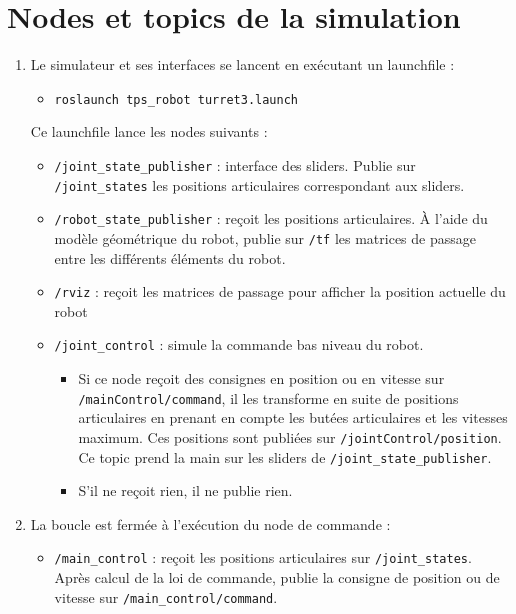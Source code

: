 \documentclass[12pt,a4paper]{article}
\begin{document}
\section{Nodes et topics de la simulation}
\label{sec:nodes}
\begin{enumerate}
\item Le simulateur et ses interfaces se lancent en exécutant un launchfile :
\begin{itemize}
\item \texttt{roslaunch tps\_robot turret3.launch}
\end{itemize}
 Ce launchfile lance les nodes suivants :
\begin{itemize}
\item \texttt{/joint\_state\_publisher} : interface des sliders. Publie sur \texttt{/joint\_states} les positions articulaires correspondant aux sliders.
\item \texttt{/robot\_state\_publisher} : reçoit les positions articulaires. À l'aide du modèle géométrique du robot, publie sur \texttt{/tf} les  matrices de passage entre les différents éléments du robot.
\item \texttt{/rviz} : reçoit les matrices de passage pour afficher la position actuelle du robot
\item \texttt{/joint\_control} : simule la commande bas niveau du robot.
\begin{itemize}
\item Si ce node reçoit des consignes en position ou en vitesse sur \texttt{/mainControl/command}, il les transforme en suite de positions articulaires en prenant en compte les butées articulaires et les vitesses maximum. Ces positions sont publiées sur \texttt{/jointControl/position}. Ce topic prend la main sur les sliders de \texttt{/joint\_state\_publisher}.
\item S'il ne reçoit rien, il ne publie rien.
\end{itemize}
\end{itemize}
\item La boucle est fermée à l'exécution du node de commande :
\begin{itemize}
\item \texttt{/main\_control} : reçoit les positions articulaires sur \texttt{/joint\_states}. Après calcul de la loi de commande, publie la consigne de position ou de vitesse sur \texttt{/main\_control/command}.
\end{itemize}

\end{enumerate}
\end{document}
